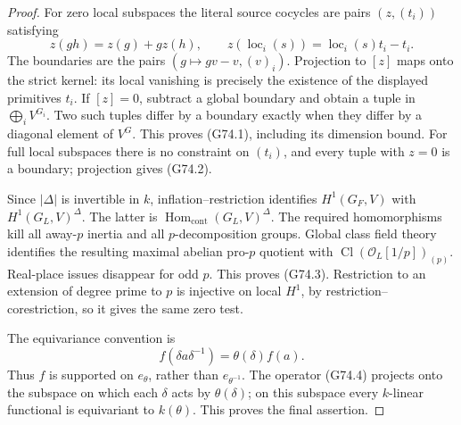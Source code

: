\begin{proof}
For zero local subspaces the literal source cocycles are pairs
\((z,(t_i))\) satisfying
\[
 z(gh)=z(g)+g z(h),\qquad
 z(\operatorname{loc}_i(s))=\operatorname{loc}_i(s)t_i-t_i.
\]
The boundaries are the pairs
\((g\mapsto gv-v,(v)_i)\).
Projection to \([z]\) maps onto the strict kernel: its local
vanishing is precisely the existence of the displayed primitives
\(t_i\).  If \([z]=0\), subtract a global boundary and obtain a tuple
in \(\bigoplus_i V^{G_i}\).  Two such tuples differ by a boundary
exactly when they differ by a diagonal element of \(V^G\).
This proves (G74.1), including its dimension bound.
For full local subspaces there is no constraint on \((t_i)\),
and every tuple with \(z=0\) is a boundary; projection gives
(G74.2).

Since \(|\Delta|\) is invertible in \(k\), inflation--restriction
identifies \(H^1(G_F,V)\) with
\(H^1(G_L,V)^\Delta\).  The latter is
\(\operatorname{Hom}_{\mathrm{cont}}(G_L,V)^\Delta\).
The required homomorphisms kill all away-\(p\) inertia and all
\(p\)-decomposition groups.  Global class field theory identifies
the resulting maximal abelian pro-\(p\) quotient with
\(\operatorname{Cl}(\mathcal O_L[1/p])_{(p)}\).
Real-place issues disappear for odd \(p\).
This proves (G74.3).  Restriction to an extension of degree prime
to \(p\) is injective on local \(H^1\), by
restriction--corestriction, so it gives the same zero test.

The equivariance convention is
\[
                 f(\delta a\delta^{-1})=\theta(\delta)f(a).
                                                               \tag{G74.5}
\]
Thus \(f\) is supported on \(e_\theta\), rather than
\(e_{\theta^{-1}}\).  The operator (G74.4) projects onto the
subspace on which each \(\delta\) acts by \(\theta(\delta)\);
on this subspace every \(k\)-linear functional is equivariant
to \(k(\theta)\).  This proves the final assertion.
\end{proof}

